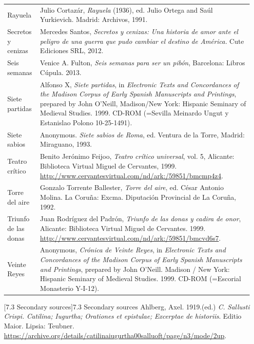 \documentclass[10pt]{article}
\makeatletter
\renewcommand\subsection{\@startsection{subsection}{2}{0.0cm}{0.25in}{0.1665in}{\normalfont\normalsize\fontsize{12pt}{14.4pt}\selectfont\bfseries\raggedright}}
\newenvironment{styleStandard}{\renewcommand\baselinestretch{1.25}\setlength\leftskip{0cm}\setlength\rightskip{0cm}\setlength\parindent{0cm}\setlength\parfillskip{0pt plus 1fil}\setlength\parskip{0in plus 1pt}\writerlistparindent\writerlistleftskip\leavevmode\normalfont\normalsize\fontsize{12pt}{14.4pt}\selectfont\writerlistlabel\ignorespaces}{\unskip\vspace{0in plus 1pt}\par}
\newcommand\writerlistleftskip{}
\newcommand\writerlistparindent{}
\newcommand\writerlistlabel{}
\makeatother
\begin{document}
\begin{flushleft}
\begin{supertabular}{m{1.7955599in}m{4.42126in}}
Rayuela  &
Julio Cortazár, \textit{Rayuela }(1936), ed. Julio Ortega and Saúl Yurkievich. Madrid: Archivos, 1991.\\
Secretos y cenizas  &
Mercedes Santos, \textit{Secretos y cenizas: Una historia de amor ante el peligro de una guerra que pudo cambiar el destino de América.} Cute Ediciones SRL, 2012.\\
Seis semanas\textit{ } &
Venice A.\textit{ }Fulton, \textit{Seis semanas para ser un pibón}, Barcelona: Libros Cúpula. 2013.\\
Siete partidas  &
Alfonso X, \textit{Siete partidas}, in \textit{Electronic Texts and Concordances of the Madison Corpus of Early Spanish Manuscripts and Printings},\textit{ }prepared by John O’Neill, Madison/New York: Hispanic Seminary of Medieval Studies. 1999. CD-ROM (=Sevilla Meinardo Ungut y Estanislao Polono 10-25-1491)\textit{.}\\
Siete sabios &
Anonymous. \textit{Siete sabios de Roma}, ed. Ventura de la Torre, Madrid: Miraguano, 1993.\\
Teatro crítico\textit{ } &
Benito Jerónimo Feijoo, \textit{Teatro crítico universal}, vol. 5, Alicante: Biblioteca Virtual Miguel de Cervantes, 1999. \url{http://www.cervantesvirtual.com/nd/ark:/59851/bmcmp4z4}.\\
Torre del aire  &
Gonzalo Torrente Ballester, \textit{Torre del aire}, ed. César Antonio Molina. La Coruña: Excma. Diputación Provincial de La Coruña, 1992.\\
Triunfo de las donas  &
Juan Rodríguez del Padrón, \textit{Triunfo de las donas y cadira de onor}, Alicante: Biblioteca Virtual Miguel de Cervantes. 1999. \url{http://www.cervantesvirtual.com/nd/ark:/59851/bmcvd6s7}.\\
Veinte Reyes  &
Anonymous, \textit{Crónica de Veinte Reyes}, in \textit{Electronic Texts and Concordances of the Madison Corpus of Early Spanish Manuscripts and Printings}, prepared by John O’Neill. Madison / New York: Hispanic Seminary of Medieval Studies. 1999. CD-ROM (=Escorial Monasterio Y-I-12).\\
\end{supertabular}
\end{flushleft}
\subsection[7.3 Secondary sources]{7.3 Secondary sources}
\begin{styleStandard}
Ahlberg, Axel. 1919.(ed.) \textit{C. Sallusti Crispi. Catilina; Iugurtha; Orationes et epistulae; Excerptae de historiis}. Editio Maior. Lipsia: Teubner. \url{https://archive.org/details/catilinaiugurtha00salluoft/page/n3/mode/2up}.
\end{styleStandard}
\end{document}
